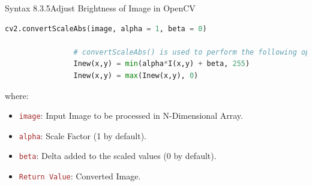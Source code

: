 \documentclass{book}
\begin{document}
\begin{synBox}{Syntax 8.3.5}{Adjust Brightness of Image in OpenCV}
    \begin{lstlisting}[language=Python, basicstyle=\ttfamily\small, keywordstyle=\color{blue}, commentstyle=\color{forestgreen}, stringstyle=\color{red}, showstringspaces=false]
                cv2.convertScaleAbs(image, alpha = 1, beta = 0)

                # convertScaleAbs() is used to perform the following operation:
                Inew(x,y) = min(alpha*I(x,y) + beta, 255)
                Inew(x,y) = max(Inew(x,y), 0)
    \end{lstlisting}
    where:
    \begin{itemize}
        \item \textcolor{brown}{\texttt{image}}: Input Image to be processed in N-Dimensional Array.
        \item \textcolor{brown}{\texttt{alpha}}: Scale Factor (1 by default).
        \item \textcolor{brown}{\texttt{beta}}: Delta added to the scaled values (0 by default).
        \item \textcolor{brown}{\texttt{Return Value}}: Converted Image.
    \end{itemize}
\end{synBox}
\end{document}
